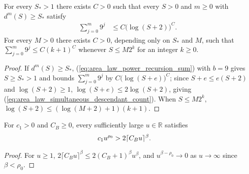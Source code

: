 \begin{lemma}
    \label{thm:area_law_repair_descendant_count}
    \leanok
    For every $S_*>1$ there exists $C>0$ such that every $S>0$ and $m\ge0$
    with $d^{m}(S)\ge S_*$ satisfy
    \begin{align}
        \sum_{j=0}^{m}9^{j} & \le C\bigl(\log(S+2)\bigr)^{C}.
        \label{eq:area_law_simultaneous_descendant_count}
    \end{align}
    For every $M>0$ there exists $C>0$, depending only on $S_*$ and $M$, such
    that $\sum_{j=0}^{m}9^{j}\le C(k+1)^{C}$ whenever $S\le M2^{k}$ for an
    integer $k\ge0$.
\end{lemma}

\begin{proof}
    \leanok
    If $d^{m}(S)\ge S_*$, (\ref{eq:area_law_power_recursion_sum}) with $b=9$
    gives $S\ge S_*>1$ and bounds $\sum_{j=0}^{m}9^{j}$ by
    $C\bigl(\log(S+e)\bigr)^{C}$; since $S+e\le e(S+2)$ and $\log(S+2)\ge1$,
    $\log(S+e)\le2\log(S+2)$, giving (\ref{eq:area_law_simultaneous_descendant_count}).
    When $S\le M2^{k}$, $\log(S+2)\le(\log(M+2)+1)(k+1)$.
\end{proof}

\begin{lemma}
    \label{thm:area_law_fine_clearance}
    \leanok
    For $c_1>0$ and $C_B\ge0$, every sufficiently large $u\in\mathbb R$
    satisfies
    \begin{align}
        c_1u^{\rho_0} & >2\lceil C_Bu\rceil^{\beta}.
        \notag
    \end{align}
\end{lemma}

\begin{proof}
    \leanok
    For $u\ge1$, $2\lceil C_Bu\rceil^{\beta}\le2(C_B+1)^{\beta}u^{\beta}$,
    and $u^{\beta-\rho_0}\to0$ as $u\to\infty$ since $\beta<\rho_0$.
\end{proof}
